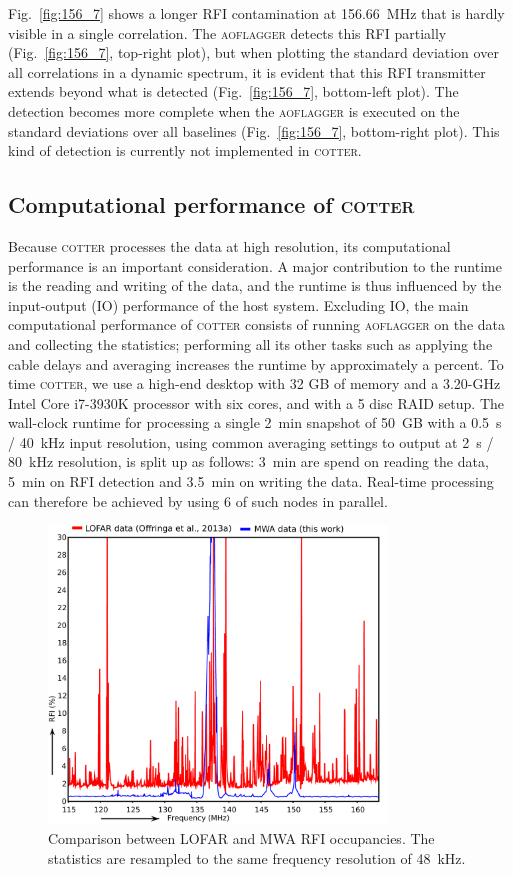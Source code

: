 \documentclass{pasa}
\begin{document}
Fig.~\ref{fig:156_7} shows a longer RFI contamination at 156.66~MHz that is hardly visible in a single correlation. The \textsc{aoflagger} detects this RFI partially (Fig.~\ref{fig:156_7}, top-right plot), but when plotting the standard deviation over all correlations in a dynamic spectrum, it is evident that this RFI transmitter extends beyond what is detected (Fig.~\ref{fig:156_7}, bottom-left plot). The detection becomes more complete when the \textsc{aoflagger} is executed on the standard deviations over all baselines (Fig.~\ref{fig:156_7}, bottom-right plot). This kind of detection is currently not implemented in \textsc{cotter}.

\subsection{Computational performance of \textsc{cotter}}
Because \textsc{cotter} processes the data at high resolution, its computational performance is an important consideration. A major contribution to the runtime is the reading and writing of the data, and the runtime is thus influenced by the input-output (IO) performance of the host system. Excluding IO, the main computational performance of \textsc{cotter} consists of running \textsc{aoflagger} on the data and collecting the statistics; performing all its other tasks such as applying the cable delays and averaging increases the runtime by approximately a percent. To time \textsc{cotter}, we use a high-end desktop with 32 GB of memory and a 3.20-GHz Intel Core i7-3930K processor with six cores, and with a 5 disc RAID setup. The wall-clock runtime for processing a single 2~min snapshot of 50~GB with a 0.5~s / 40~kHz input resolution, using common averaging settings to output at 2~s / 80~kHz resolution, is split up as follows: 3~min are spend on reading the data, 5~min on RFI detection and 3.5~min on writing the data. Real-time processing can therefore be achieved by using 6 of such nodes in parallel.

\noindent\begin{figure}
\begin{center}\hspace*{-0.2cm}\includegraphics[width=9cm]{img/LOFAR-MWA-occupancy}
\caption{Comparison between LOFAR and MWA RFI occupancies. The statistics are resampled to the same frequency resolution of 48~kHz. }
\label{fig:lofar-mwa-occupancy}
\end{center}
\end{figure}
\end{document}
